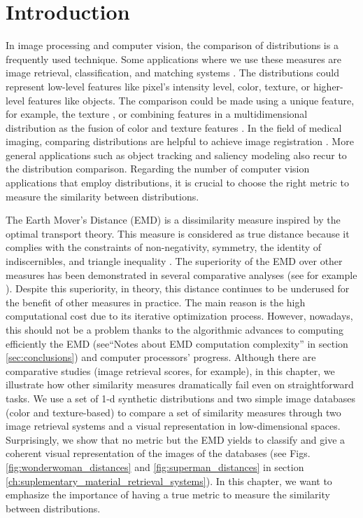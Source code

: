 \section{Introduction}\label{sec:introduction}
In image processing and computer vision, the comparison of distributions is a frequently used technique. Some applications where we use these measures are image retrieval, classification, and matching systems \citep{Smeulders.Worring.ea:PAMI:2000}. The distributions could represent low-level features like pixel's intensity level, color, texture, or higher-level features like objects. The comparison could be made using a unique feature, for example, the texture \citep{Banerjee.Bhunia.ea:ESWA:2018, Kwitt.Uhl:ICIP:2008}, or combining features in a multidimensional distribution as the fusion of color and texture features \citep{Liu.Guo.ea:IS:2017}. In the field of medical imaging, comparing distributions are helpful to achieve image registration \citep{So.Chung:JPR:2017}. More general applications such as object tracking \citep{Nejhum.Ho.ea:CVPR:2008, Klein.Frintrop:CV:2011} and  saliency modeling \citep{Bylinskii.Judd.ea:PAMI:2018} also recur to the distribution comparison. Regarding the number of computer vision applications that employ distributions, it is crucial to choose the right metric to measure the similarity between distributions.

The Earth Mover's Distance (EMD) \citep{Rubner.Tomasi.ea:IJCV:2000} is a dissimilarity measure inspired by the optimal transport theory. This measure is considered as true distance because it complies with the constraints of non-negativity, symmetry, the identity of indiscernibles, and triangle inequality \citep{Peyre.Cuturi:arXiv:2018}. The superiority of the EMD over other measures has been demonstrated in several comparative analyses (see for example \citep{Puzicha.Buhmann.ea:ICCV:1999, Rubner.Tomasi.ea:IJCV:2000}).  Despite this superiority, in theory, this distance continues to be underused for the benefit of other measures in practice. The main reason is the high computational cost due to its iterative optimization process. However, nowadays, this should not be a problem thanks to the algorithmic advances to computing efficiently the EMD (see``Notes about EMD computation complexity'' in section \ref{sec:conclusions}) and computer processors' progress. Although there are comparative studies (image retrieval scores, for example), in this chapter, we illustrate how other similarity measures dramatically fail even on straightforward tasks. We use a set of 1-d synthetic distributions and two simple image databases (color and texture-based) to compare a set of similarity measures through two image retrieval systems and a visual representation in low-dimensional spaces. Surprisingly, we show that no metric but the EMD yields to classify and give a coherent visual representation of the images of the databases (see Figs. \ref{fig:wonderwoman_distances} and \ref{fig:superman_distances} in section \ref{ch:suplementary_material_retrieval_systems}). In this chapter, we want to emphasize the importance of having a true metric to measure the similarity between distributions.

